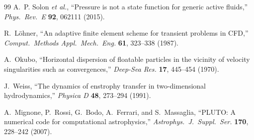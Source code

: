 \documentclass[12pt, a4paper, oneside]{report}
\begin{document}
\begin{thebibliography}{99}
A.~P. Solon \textit{et al.}, ``Pressure is not a state function for generic active fluids,'' \textit{Phys.\ Rev.\ E} \textbf{92}, 062111 (2015).

R.~L\"ohner, ``An adaptive finite element scheme for transient problems in CFD,'' \textit{Comput.\ Methods Appl.\ Mech.\ Eng.} \textbf{61}, 323--338 (1987).

A.~Okubo, ``Horizontal dispersion of floatable particles in the vicinity of velocity singularities such as convergences,'' \textit{Deep-Sea Res.} \textbf{17}, 445--454 (1970).

J.~Weiss, ``The dynamics of enstrophy transfer in two-dimensional hydrodynamics,'' \textit{Physica D} \textbf{48}, 273--294 (1991).

A.~Mignone, P.~Rossi, G.~Bodo, A.~Ferrari, and S.~Massaglia, ``PLUTO: A numerical code for computational astrophysics,'' \textit{Astrophys.\ J.\ Suppl.\ Ser.} \textbf{170}, 228--242 (2007).

\end{thebibliography}
\end{document}
